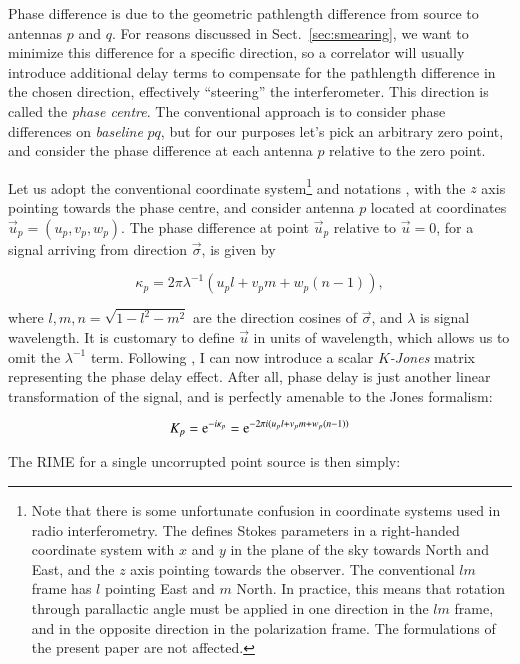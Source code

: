 \documentclass[referee]{aa}
\begin{document}
Phase difference is due to the geometric pathlength difference from source to antennas $p$ and $q$. For reasons discussed in Sect.~\ref{sec:smearing}, we want to minimize this difference for a specific direction, so a correlator will usually introduce additional delay terms to compensate for the pathlength difference in the chosen direction, effectively ``steering'' the interferometer. This direction is called the {\em phase centre}. The conventional approach is to consider phase differences on {\em baseline} $pq$, but for our purposes let's pick an arbitrary zero point, and consider the phase difference at each antenna $p$ relative to the zero point.

Let us adopt the conventional coordinate system\footnote{Note that there is some unfortunate confusion in coordinate systems used in radio interferometry. The \citet{IAU74} defines Stokes parameters in a right-handed coordinate system with $x$ and $y$ in the plane of the sky towards North and East, and the $z$ axis pointing towards the observer. The conventional $lm$ frame has $l$ pointing East and $m$ North. In practice, this means that rotation through parallactic angle must be applied in one direction in the $lm$ frame, and in the opposite direction in the polarization frame. The formulations of the present paper are not affected.} and notations \citep[see e.g.][]{tms}, with the $z$ axis pointing towards the phase centre, and consider antenna $p$ located at coordinates $\vec u_p=(u_p,v_p,w_p)$. The phase difference at point $\vec u_p$ relative to $\vec u=0$, for a signal arriving from direction $\vec\sigma$, is given by

  \[
  \kappa_p = 2\pi\lambda^{-1}(u_p l+v_p m+w_p (n-1)),
  \]

where $l,m,n=\sqrt{1-l^2-m^2}$ are the direction cosines of $\vec\sigma$, and $\lambda$ is signal wavelength. It is customary to define $\vec u$ in units of wavelength, which allows us to omit the $\lambda^{-1}$ term.
Following \citet{JEN:note185}, I can now introduce a scalar {\em $K$-Jones} matrix representing the phase delay effect. After all, phase delay is just another linear transformation of the signal, and is perfectly amenable to the Jones formalism:

  \begin{equation}\label{eq:K}
  K_p = {\rm e}^{-i\kappa_p} = {\rm e}^{-2\pi i(u_p l+v_p m+w_p (n-1))}
  \end{equation}

The RIME for a single uncorrupted point source is then simply:
\end{document}
